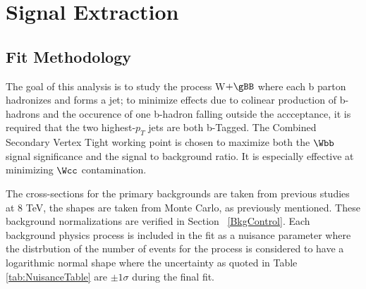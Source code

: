 \section{Signal Extraction}\label{BkgControl2}
\subsection{Fit Methodology}
The goal of this analysis is to study the process W$+\gBB$ where
each b parton hadronizes and forms a jet; to minimize effects due to colinear 
production of b-hadrons and the occurence of one b-hadron falling outside the
accceptance, it is required that the two highest-$p_{T}$ jets are both
b-Tagged. 
The Combined Secondary Vertex Tight working point is chosen to maximize
both the $\Wbb $ signal significance and the signal to background ratio.
It is especially effective at minimizing $\Wcc$ contamination.

The cross-sections for the primary backgrounds are taken from previous studies at 
8 TeV, the shapes are taken from Monte Carlo, as previously mentioned.
These background normalizations are verified in Section ~\ref{BkgControl}.
Each background physics process is included in the fit as a nuisance parameter where the distrbution of the number of events for the process is considered to have a logarithmic normal shape where the uncertainty as quoted in Table \ref{tab:NuisanceTable} are $\pm1\sigma$ during the final fit.\\


